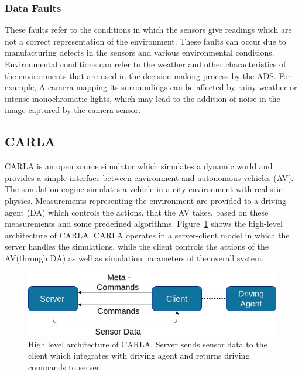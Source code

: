 \subsubsection{Data Faults} 
These faults refer to the conditions in which the sensors give readings which are not a correct representation of the environment. These faults can occur due to manufacturing defects in the sensors and various environmental conditions. Environmental conditions can refer to the weather and other characteristics of the environments that are used in the decision-making process by the ADS. For example, A camera mapping its surroundings can be affected by rainy weather or intense monochromatic lights, which may lead to the addition of noise in the image captured by the camera sensor.
 
\subsection{CARLA} \label{ri-carla}
CARLA is an open source simulator which simulates a dynamic world and provides a simple interface between environment and autonomous vehicles (AV). The simulation engine simulates a vehicle in a city environment with realistic physics. Measurements representing the environment are provided to a driving agent (DA) which controls the actions, that the AV takes, based on these measurements and some predefined algorithms. Figure~\ref{fig:carla_arch} shows the high-level architecture of CARLA. CARLA operates in a server-client model in which the server handles the simulations, while the client controls the actions of the AV(through DA) as well as simulation parameters of the overall system. 
 
 
 \begin{figure}  [h]
 	\vspace{-0.5em}
 	\centering
 	\includegraphics[scale=0.4]{CARLA_block}
 	\vspace{-0.5em}
 	\caption{High level architecture of CARLA, Server sends sensor data to the client which integrates with driving agent and returns driving commands to server.}
 	\label{fig:carla_arch}
 	\vspace{-1.5em}
 \end{figure}
 
